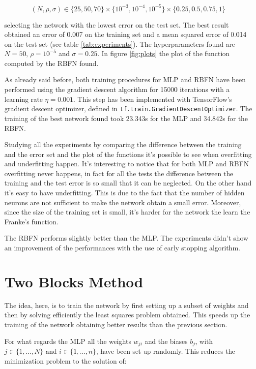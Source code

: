 \documentclass[a4paper]{article}
\numberwithin{equation}{section} %
\numberwithin{figure}{section} %
\numberwithin{table}{section} %
\theoremstyle{definition}
\begin{document}
\[ (N, \rho, \sigma) \in \Big\{25, 50, 70\Big\} \times \Big\{10^{-3}, 10^{-4}, 10^{-5}\Big\}
\times \Big\{0.25, 0.5, 0.75, 1\Big\} \]

\noindent selecting the network with the lowest error on the test set.
The best result obtained an error of 0.007 on the training set and a mean squared error of
0.014 on the test set (see table \ref{tab:experiments}).
The hyperparameters found are $N=50$, $\rho=10^{-5}$ and $\sigma=0.25$. In figure \ref{fig:plots}
the plot of the function computed by the RBFN found.

As already said before, both training procedures for MLP and RBFN have been
performed using the gradient descent algorithm for 15000 iterations with a
learning rate $\eta = 0.001$. This step has been implemented with TensorFlow's
gradient descent optimizer, defined in \texttt{tf.train.GradientDescentOptimizer}.
The training of the best network found took 23.343s for the MLP and 34.842s for
the RBFN.

Studying all the experiments by comparing the difference between the training
and the error set and the plot of the functions it's possible to see when
overfitting and underfitting happen. It's interesting to notice that for both
MLP and RBFN overfitting never happens, in fact for all the tests the difference
between the training and the test error is so small that it can be neglected.
On the other hand it's easy to have underfitting. This is due to the fact that
the number of hidden neurons are not sufficient to make the network obtain a
small error. Moreover, since the size of the training set is small, it's
harder for the network the learn the Franke's function.

The RBFN performs slightly better than the MLP. The experiments didn't show
an improvement of the performances with the use of early stopping algorithm.


\section{Two Blocks Method}

The idea, here, is to train the network by first setting up a subset of weights
and then by solving efficiently the least squares problem obtained. This
speeds up the training of the network obtaining better results than the
previous section.

For what regards the MLP all the weights $w_{ji}$ and the biases $b_j$, with
$j \in \{ 1, ..., N \} $ and $i \in \{ 1, ..., n \} $, have been set up
randomly. This reduces the minimization problem to the solution of:
\end{document}
